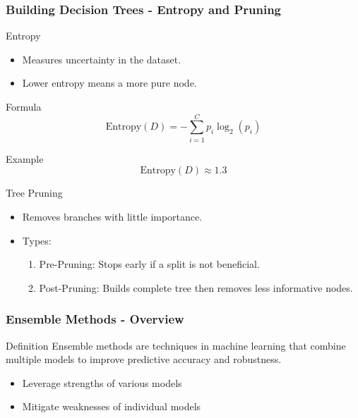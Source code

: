 \documentclass[aspectratio=169]{beamer}
\begin{document}
\begin{frame}[fragile]
    \frametitle{Building Decision Trees - Entropy and Pruning}
    \begin{block}{Entropy}
        \begin{itemize}
            \item Measures uncertainty in the dataset.
            \item Lower entropy means a more pure node.
        \end{itemize}
        
        \begin{block}{Formula}
            \begin{equation}
            \text{Entropy}(D) = -\sum_{i=1}^{C} p_i \log_2(p_i)
            \end{equation}
        \end{block}
        
        \begin{block}{Example}
            \begin{equation}
            \text{Entropy}(D) \approx 1.3
            \end{equation}
        \end{block}
    \end{block}
    
    \begin{block}{Tree Pruning}
        \begin{itemize}
            \item Removes branches with little importance.
            \item Types:
            \begin{enumerate}
                \item Pre-Pruning: Stops early if a split is not beneficial.
                \item Post-Pruning: Builds complete tree then removes less informative nodes.
            \end{enumerate}
        \end{itemize}
    \end{block}
\end{frame}

\begin{frame}[fragile]
    \frametitle{Ensemble Methods - Overview}
    \begin{block}{Definition}
        Ensemble methods are techniques in machine learning that combine multiple models to improve predictive accuracy and robustness.
    \end{block}
    \begin{itemize}
        \item Leverage strengths of various models
        \item Mitigate weaknesses of individual models
    \end{itemize}
\end{frame}
\end{document}
